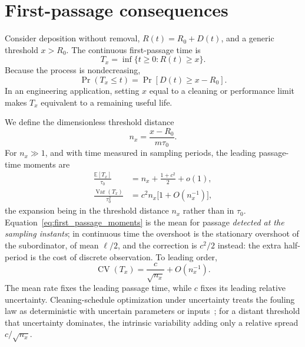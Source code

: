 \documentclass[preprint,12pt]{elsarticle}
\begin{document}
\section{First-passage consequences}
\label{sec:first_passage}

Consider deposition without removal, $R(t)=R_0+D(t)$, and a generic threshold
$x>R_0$. The continuous first-passage time is
\begin{equation}
  T_x=\inf\{t\geq0:R(t)\geq x\}.
  \label{eq:first_passage_definition}
\end{equation}
Because the process is nondecreasing,
\begin{equation}
  \Pr(T_x\leq t)=\Pr[D(t)\geq x-R_0].
  \label{eq:first_passage_identity}
\end{equation}
In an engineering application, setting $x$ equal to a cleaning or performance
limit makes $T_x$ equivalent to a remaining useful life.

We define the dimensionless threshold distance
\begin{equation}
  n_x=\frac{x-R_0}{m\tau_0}.
  \label{eq:threshold_distance}
\end{equation}
For $n_x\gg1$, and with time measured in sampling periods, the leading
passage-time moments are
\begin{align}
  \frac{\mathbb{E}[T_x]}{\tau_0}
  &=n_x+\frac{1+c^{2}}{2}+o(1),
  \label{eq:first_passage_moments}\\
  \frac{\operatorname{Var}(T_x)}{\tau_0^{2}}
  &=c^2 n_x\bigl[1+O(n_x^{-1})\bigr],
\end{align}
the expansion being in the threshold distance $n_x$ rather than in $\tau_0$.
Equation~\eqref{eq:first_passage_moments} is the mean for passage
\emph{detected at the sampling instants}; in continuous time the overshoot is
the stationary overshoot of the subordinator, of mean $\ell/2$, and the
correction is $c^{2}/2$ instead: the extra half-period is the cost of
discrete observation. To leading order,
\begin{equation}
  \operatorname{CV}(T_x)
  =\frac{c}{\sqrt{n_x}}+O(n_x^{-1}).
  \label{eq:first_passage_cv}
\end{equation}
The mean rate fixes the leading passage time, while $c$ fixes its leading
relative uncertainty. Cleaning-schedule optimization under uncertainty treats the
fouling law as deterministic with uncertain parameters or
inputs~\cite{AlIsmaili2019,DiPretoro2021}; for a distant threshold that uncertainty dominates, the intrinsic variability adding only a relative spread
$c/\sqrt{n_x}$. 
\end{document}
